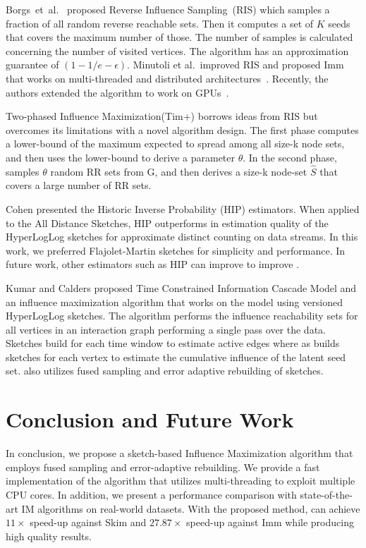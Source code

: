 \documentclass[10pt,journal,compsoc]{IEEEtran}
\newcommand\acro{{\sc{HyperFuseR\xspace}\xspace}\xspace}
\newcommand\maxspeedupIMM{{{27.87\xspace}\xspace}\xspace}
\newcommand\maxspeedupSKIM{{{11\xspace}\xspace}\xspace}
\begin{document}
Borgs~et~al.~\cite{borgs2014maximizing} proposed Reverse Influence Sampling~(RIS) which samples a fraction of all random reverse reachable sets. Then it computes a set of $K$ seeds that covers the maximum number of those. The number of samples is calculated concerning the number of visited vertices. The algorithm has an approximation guarantee of $(1-1/e-\epsilon)$. Minutoli et al.~improved RIS and proposed {\sc Imm} that works on multi-threaded and distributed architectures~\cite{minutoli2019fast}. 
Recently, the authors extended the algorithm to work on GPUs~\cite{curipples}.   

Two-phased Influence Maximization({\sc Tim+})\cite{tim} borrows ideas from RIS but overcomes its limitations with a novel algorithm design. The first phase computes a lower-bound of the maximum expected to spread among all size-k node sets, and then uses the lower-bound to derive a parameter $\theta$. In the second phase, samples $\theta$ random RR sets from G, and then derives a size-k node-set $\hat{S}$ that covers a large number of RR sets.

Cohen\cite{cohen2015all} presented the Historic Inverse Probability (HIP) estimators. When applied to the All Distance Sketches, HIP outperforms in estimation quality of the HyperLogLog sketches\cite{flajolet2007hyperloglog} for approximate distinct counting on data streams. In this work, we preferred Flajolet-Martin\cite{flajolet1985probabilistic} sketches for simplicity and performance. In future work, other estimators such as HIP can improve to improve \acro.

Kumar and Calders\cite{kumar2017information} proposed Time Constrained Information
Cascade Model and an influence maximization algorithm that works on the model using versioned HyperLogLog sketches. The algorithm performs the influence reachability sets for all vertices in an interaction graph performing a single pass over the data. Sketches build for each time window to estimate active edges where as \acro builds sketches for each vertex to estimate the cumulative influence of the latent seed set. \acro also utilizes fused sampling and error adaptive rebuilding of sketches.

\section{Conclusion and Future Work}\label{sec:conclusion}

In conclusion, we propose a sketch-based Influence Maximization algorithm that employs fused sampling and error-adaptive rebuilding. We provide a fast implementation of the algorithm that utilizes multi-threading to exploit multiple CPU cores. In addition, we present a performance comparison with state-of-the-art IM algorithms on real-world datasets. 
With the proposed method, \acro{} can achieve $\maxspeedupSKIM\times$ speed-up against {\sc Skim} and $\maxspeedupIMM\times$ speed-up against {\sc Imm} while producing high quality results. 
\end{document}
